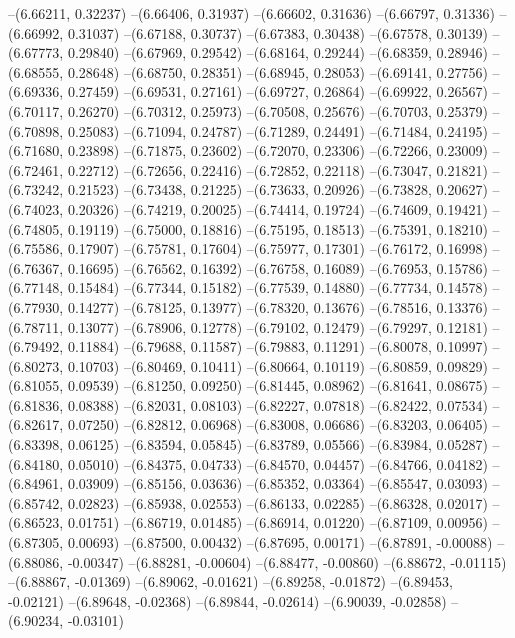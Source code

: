--(6.66211, 0.32237)
--(6.66406, 0.31937)
--(6.66602, 0.31636)
--(6.66797, 0.31336)
--(6.66992, 0.31037)
--(6.67188, 0.30737)
--(6.67383, 0.30438)
--(6.67578, 0.30139)
--(6.67773, 0.29840)
--(6.67969, 0.29542)
--(6.68164, 0.29244)
--(6.68359, 0.28946)
--(6.68555, 0.28648)
--(6.68750, 0.28351)
--(6.68945, 0.28053)
--(6.69141, 0.27756)
--(6.69336, 0.27459)
--(6.69531, 0.27161)
--(6.69727, 0.26864)
--(6.69922, 0.26567)
--(6.70117, 0.26270)
--(6.70312, 0.25973)
--(6.70508, 0.25676)
--(6.70703, 0.25379)
--(6.70898, 0.25083)
--(6.71094, 0.24787)
--(6.71289, 0.24491)
--(6.71484, 0.24195)
--(6.71680, 0.23898)
--(6.71875, 0.23602)
--(6.72070, 0.23306)
--(6.72266, 0.23009)
--(6.72461, 0.22712)
--(6.72656, 0.22416)
--(6.72852, 0.22118)
--(6.73047, 0.21821)
--(6.73242, 0.21523)
--(6.73438, 0.21225)
--(6.73633, 0.20926)
--(6.73828, 0.20627)
--(6.74023, 0.20326)
--(6.74219, 0.20025)
--(6.74414, 0.19724)
--(6.74609, 0.19421)
--(6.74805, 0.19119)
--(6.75000, 0.18816)
--(6.75195, 0.18513)
--(6.75391, 0.18210)
--(6.75586, 0.17907)
--(6.75781, 0.17604)
--(6.75977, 0.17301)
--(6.76172, 0.16998)
--(6.76367, 0.16695)
--(6.76562, 0.16392)
--(6.76758, 0.16089)
--(6.76953, 0.15786)
--(6.77148, 0.15484)
--(6.77344, 0.15182)
--(6.77539, 0.14880)
--(6.77734, 0.14578)
--(6.77930, 0.14277)
--(6.78125, 0.13977)
--(6.78320, 0.13676)
--(6.78516, 0.13376)
--(6.78711, 0.13077)
--(6.78906, 0.12778)
--(6.79102, 0.12479)
--(6.79297, 0.12181)
--(6.79492, 0.11884)
--(6.79688, 0.11587)
--(6.79883, 0.11291)
--(6.80078, 0.10997)
--(6.80273, 0.10703)
--(6.80469, 0.10411)
--(6.80664, 0.10119)
--(6.80859, 0.09829)
--(6.81055, 0.09539)
--(6.81250, 0.09250)
--(6.81445, 0.08962)
--(6.81641, 0.08675)
--(6.81836, 0.08388)
--(6.82031, 0.08103)
--(6.82227, 0.07818)
--(6.82422, 0.07534)
--(6.82617, 0.07250)
--(6.82812, 0.06968)
--(6.83008, 0.06686)
--(6.83203, 0.06405)
--(6.83398, 0.06125)
--(6.83594, 0.05845)
--(6.83789, 0.05566)
--(6.83984, 0.05287)
--(6.84180, 0.05010)
--(6.84375, 0.04733)
--(6.84570, 0.04457)
--(6.84766, 0.04182)
--(6.84961, 0.03909)
--(6.85156, 0.03636)
--(6.85352, 0.03364)
--(6.85547, 0.03093)
--(6.85742, 0.02823)
--(6.85938, 0.02553)
--(6.86133, 0.02285)
--(6.86328, 0.02017)
--(6.86523, 0.01751)
--(6.86719, 0.01485)
--(6.86914, 0.01220)
--(6.87109, 0.00956)
--(6.87305, 0.00693)
--(6.87500, 0.00432)
--(6.87695, 0.00171)
--(6.87891, -0.00088)
--(6.88086, -0.00347)
--(6.88281, -0.00604)
--(6.88477, -0.00860)
--(6.88672, -0.01115)
--(6.88867, -0.01369)
--(6.89062, -0.01621)
--(6.89258, -0.01872)
--(6.89453, -0.02121)
--(6.89648, -0.02368)
--(6.89844, -0.02614)
--(6.90039, -0.02858)
--(6.90234, -0.03101)
